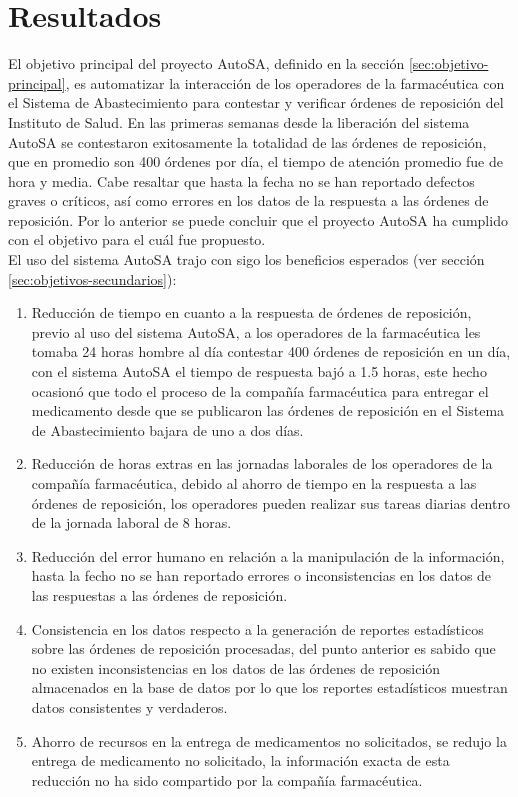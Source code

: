 \section{Resultados}
El objetivo principal del proyecto AutoSA, definido en la sección \ref{sec:objetivo-principal}, es automatizar la interacción de los operadores de la farmacéutica con el Sistema de Abastecimiento para contestar y verificar órdenes de reposición del Instituto de Salud. En las primeras semanas desde la liberación del sistema AutoSA se contestaron exitosamente la totalidad de las órdenes de reposición, que en promedio son 400 órdenes por día, el tiempo de atención promedio fue de hora y media. Cabe resaltar que hasta la fecha no se han reportado defectos graves o críticos, así como errores en los datos de la respuesta a las órdenes de reposición. Por lo anterior se puede concluir que el proyecto AutoSA ha cumplido con el objetivo para el cuál fue propuesto.\\

El uso del sistema AutoSA trajo con sigo los beneficios esperados (ver sección \ref{sec:objetivos-secundarios}):
\begin{enumerate}
	\item Reducción de tiempo en cuanto a la respuesta de órdenes de reposición, previo al uso del sistema AutoSA, a los operadores de la farmacéutica les tomaba 24 horas hombre al día contestar 400 órdenes de reposición en un día, con el sistema AutoSA el tiempo de respuesta bajó a 1.5 horas, este hecho ocasionó que todo el proceso de la compañía farmacéutica para entregar el medicamento desde que se publicaron las órdenes de reposición en el Sistema de Abastecimiento bajara de uno a dos días.
	\item Reducción de horas extras en las jornadas laborales de los operadores de la compañía farmacéutica, debido al ahorro de tiempo en la respuesta a las órdenes de reposición, los operadores pueden realizar sus tareas diarias dentro de la jornada laboral de 8 horas.
	\item Reducción del error humano en relación a la manipulación de la información, hasta la fecho no se han reportado errores o inconsistencias en los datos de las respuestas a las órdenes de reposición.
	\item Consistencia en los datos respecto a la generación de reportes estadísticos sobre las órdenes de reposición procesadas, del punto anterior es sabido que no existen inconsistencias en los datos de las órdenes de reposición almacenados en la base de datos por lo que los reportes estadísticos muestran datos consistentes y verdaderos.
	\item Ahorro de recursos en la entrega de medicamentos no solicitados, se redujo la entrega de medicamento no solicitado, la información exacta de esta reducción no ha sido compartido por la compañía farmacéutica.
\end{enumerate}


